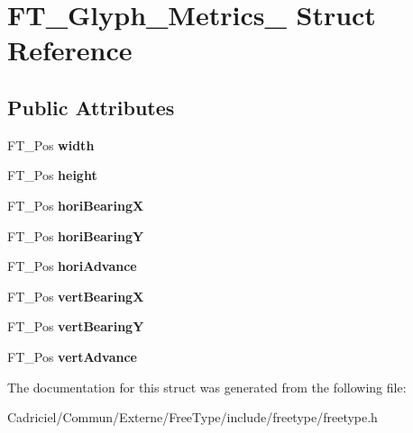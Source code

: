 \hypertarget{struct_f_t___glyph___metrics__}{}\section{F\+T\+\_\+\+Glyph\+\_\+\+Metrics\+\_\+ Struct Reference}
\label{struct_f_t___glyph___metrics__}
\subsection*{Public Attributes}
\begin{DoxyCompactItemize}
\item 
F\+T\+\_\+\+Pos {\bfseries width}\hypertarget{struct_f_t___glyph___metrics___a0ff1be869e6a28d1f2990b0e5719dca9}{}\label{struct_f_t___glyph___metrics___a0ff1be869e6a28d1f2990b0e5719dca9}

\item 
F\+T\+\_\+\+Pos {\bfseries height}\hypertarget{struct_f_t___glyph___metrics___aa2a76ec448ec9d18acf343f01b77cb21}{}\label{struct_f_t___glyph___metrics___aa2a76ec448ec9d18acf343f01b77cb21}

\item 
F\+T\+\_\+\+Pos {\bfseries hori\+BearingX}\hypertarget{struct_f_t___glyph___metrics___a2afc877f52c8a8910ec144a1948186cc}{}\label{struct_f_t___glyph___metrics___a2afc877f52c8a8910ec144a1948186cc}

\item 
F\+T\+\_\+\+Pos {\bfseries hori\+BearingY}\hypertarget{struct_f_t___glyph___metrics___afd97c10d43ed1f66598a18884468b536}{}\label{struct_f_t___glyph___metrics___afd97c10d43ed1f66598a18884468b536}

\item 
F\+T\+\_\+\+Pos {\bfseries hori\+Advance}\hypertarget{struct_f_t___glyph___metrics___af12db260a90b8a7c938ad48ebf20ccbe}{}\label{struct_f_t___glyph___metrics___af12db260a90b8a7c938ad48ebf20ccbe}

\item 
F\+T\+\_\+\+Pos {\bfseries vert\+BearingX}\hypertarget{struct_f_t___glyph___metrics___aead5c5637b983b811738bff3bcea8cea}{}\label{struct_f_t___glyph___metrics___aead5c5637b983b811738bff3bcea8cea}

\item 
F\+T\+\_\+\+Pos {\bfseries vert\+BearingY}\hypertarget{struct_f_t___glyph___metrics___a7f1aba91b86fddeb11030eab15dcce08}{}\label{struct_f_t___glyph___metrics___a7f1aba91b86fddeb11030eab15dcce08}

\item 
F\+T\+\_\+\+Pos {\bfseries vert\+Advance}\hypertarget{struct_f_t___glyph___metrics___a594f43c64fe5c12a399a0f0a47c04990}{}\label{struct_f_t___glyph___metrics___a594f43c64fe5c12a399a0f0a47c04990}

\end{DoxyCompactItemize}


The documentation for this struct was generated from the following file\+:\begin{DoxyCompactItemize}
\item 
Cadriciel/\+Commun/\+Externe/\+Free\+Type/include/freetype/freetype.\+h\end{DoxyCompactItemize}
